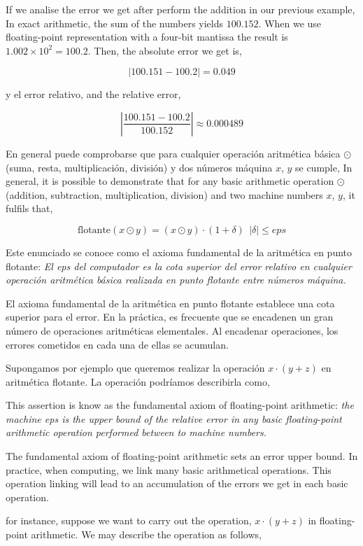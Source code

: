\begin{paracol}{2}
If we analise the error we get after perform the addition in our previous example, In exact arithmetic, the sum of the numbers yields $100.152$. When  we use floating-point representation with a four-bit mantissa the result is $1.002\times10^2=100.2$. Then, the absolute error we get is,     
\end{paracol}

\begin{equation*}
\vert 100.151-100.2 \vert=0.049
\end{equation*}
\begin{paracol}{2}
y el error relativo,
\switchcolumn
and the relative error,
\end{paracol}
\begin{equation*}
\left\vert\frac{100.151-100.2 }{100.152}\right\vert\approx 0.000489
\end{equation*}
\begin{paracol}{2}
En general puede comprobarse que para cualquier operación aritmética básica $\odot \ $(suma, resta, multiplicación, división) y dos números máquina $x$, $y$ se cumple,
\switchcolumn
In general, it is possible to demonstrate that for any basic arithmetic operation $\odot \ $(addition, subtraction, multiplication, division) and two machine numbers $x$, $y$, it fulfils that,
\end{paracol}
\begin{equation*}
\text{flotante}(x\odot y)=(x\odot y)\cdot(1+\delta) \ \ \vert \delta \vert \leq eps
\end{equation*}
\begin{paracol}{2}
Este enunciado se conoce como el axioma fundamental de la aritmética en punto flotante:\emph{ El eps del computador es la cota superior del error relativo en cualquier operación aritmética  básica realizada en punto flotante entre números máquina.} 

El axioma fundamental de la aritmética en punto flotante establece una cota superior para el error. En la práctica, es frecuente que se encadenen un gran número de operaciones aritméticas elementales. Al encadenar operaciones, los errores cometidos en cada una de ellas se acumulan.

Supongamos por ejemplo que queremos realizar la operación $x\cdot(y+z)$ en aritmética flotante. La operación podríamos describirla como,

\switchcolumn
This assertion is know as the fundamental axiom of floating-point arithmetic: \emph{the machine eps is the upper bound of the relative error in any basic floating-point arithmetic operation performed between to machine numbers.}

The fundamental axiom of floating-point arithmetic sets an error upper bound. In practice, when computing, we link many basic arithmetical operations. This operation linking will lead to an accumulation of the errors we get in each basic operation.

for instance, suppose we want to carry out the operation, $x\cdot(y+z)$ in floating-point arithmetic. We may describe the operation as follows,     
\end{paracol}

